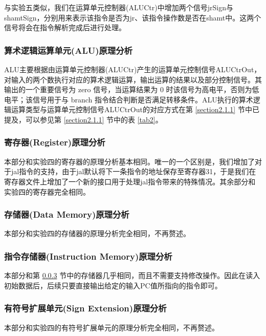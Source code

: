 \documentclass{cumcm}
\numberwithin{equation}{section}
\numberwithin{equation}{subsection}
\begin{document}
与实验五类似，我们在运算单元控制器(ALUCtr)中增加两个信号jrSign与shamtSign，分别用来表示该指令是否为jr、该指令操作数是否在shamt中。这两个信号将会在指令解析完成后进行处理。

\subsubsection{算术逻辑运算单元(ALU)原理分析}\label{section2.1.2}

ALU主要根据由运算单元控制器(ALUCtr)产生的运算单元控制信号ALUCtrOut，对输入的两个数执行对应的算术逻辑运算，输出运算的结果以及部分控制信号。其输出的一个重要信号为 zero 信号，当运算结果为 0 时该信号为高电平，否则为低电平；该信号用于与 branch 指令结合判断是否满足转移条件。ALU执行的算术逻辑运算类型与运算单元控制信号ALUCtrOut的对应方式在第 \ref{section2.1.1} 节中已提及，可以参见第 \ref{section2.1.1} 节中的表 \ref{tab2}。

\subsubsection{寄存器(Register)原理分析}\label{section2.1.3}

本部分和实验四的寄存器的原理分析基本相同。唯一的一个区别是，我们增加了对于jal指令的支持，由于jal默认将下一条指令的地址保存至寄存器31，于是我们在寄存器文件上增加了一个新的接口用于处理jal指令带来的特殊情况。其余部分和实验四的寄存器完全相同。

\subsubsection{存储器(Data Memory)原理分析}\label{section2.1.4}

本部分和实验四的存储器的原理分析完全相同，不再赘述。

\subsubsection{指令存储器(Instruction Memory)原理分析}\label{section2.1.5}

本部分和第 \ref{section2.1.4} 节中的存储器几乎相同，而且不需要支持修改操作。因此在读入初始数据后，后续只要直接输出给定的输入PC值所指向的指令即可。

\subsubsection{有符号扩展单元(Sign Extension)原理分析}\label{section2.1.6}

本部分和实验四的有符号扩展单元的原理分析完全相同，不再赘述。
\end{document}
